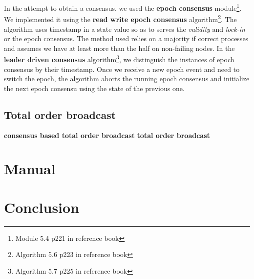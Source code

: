 \documentclass[11pt,english,a4paper]{article}
\begin{document}
In the attempt to obtain a consensus, we used the \textbf{epoch consensus} module\footnote{Module 5.4 p221 in reference book}.
We implemented it using the \textbf{read write epoch consensus} algorithm\footnote{Algorithm 5.6 p223 in reference book}.
The algorithm uses timestamp in a state value so as to serves the \emph{validity} and \emph{lock-in} or the epoch consensus.
The method used relies on a majority if correct processes and assumes we have at least more than the half on non-failing nodes.
In the \textbf{leader driven consensus} algorithm\footnote{Algorithm 5.7 p225 in reference book}, we distinguish the instances of epoch consensus by their timestamp.
Once we receive a new epoch event and need to switch the epoch, the algorithm aborts the running epoch consensus and initialize the next epoch consensu using the state of the previous one.

\subsection*{Total order broadcast}
\textbf{consensus based total order broadcast}
\textbf{total order broadcast}

\section{Manual}

\section{Conclusion}
 
\end{document}
